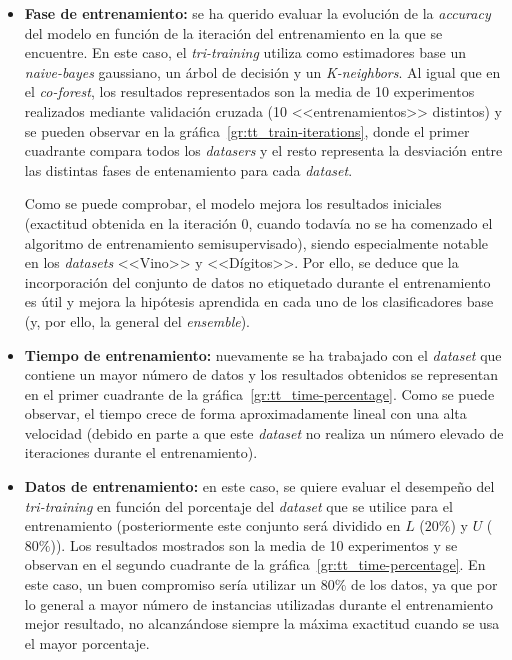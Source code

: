 \begin{itemize}
	\item \textbf{Fase de entrenamiento:} se ha querido evaluar la evolución de la \textit{accuracy} del modelo en función de la iteración del entrenamiento en la que se encuentre. En este caso, el \textit{tri-training} utiliza como estimadores base un \textit{naive-bayes} gaussiano, un árbol de decisión y un \textit{K-neighbors}. Al igual que en el \textit{co-forest}, los resultados representados son la media de 10 experimentos realizados mediante validación cruzada (10 <<entrenamientos>> distintos) y se pueden observar en la gráfica~\ref{gr:tt_train-iterations}, donde el primer cuadrante compara todos los \textit{datasers} y el resto representa la desviación entre las distintas fases de entenamiento para cada \textit{dataset}.
	
	Como se puede comprobar, el modelo mejora los resultados iniciales (exactitud obtenida en la iteración $0$, cuando todavía no se ha comenzado el algoritmo de entrenamiento semisupervisado), siendo especialmente notable en los \textit{datasets} <<Vino>> y  <<Dígitos>>. Por ello, se deduce que la incorporación del conjunto de datos no etiquetado durante el entrenamiento es útil y mejora la hipótesis aprendida en cada uno de los clasificadores base (y, por ello, la general del \textit{ensemble}).
	
	\item \textbf{Tiempo de entrenamiento:} nuevamente se ha trabajado con el \textit{dataset} que contiene un mayor número de datos y los resultados obtenidos se representan en el primer cuadrante de la gráfica~\ref{gr:tt_time-percentage}. Como se puede observar, el tiempo crece de forma aproximadamente lineal con una alta velocidad (debido en parte a que este \textit{dataset} no realiza un número elevado de iteraciones durante el entrenamiento).
	
	\item \textbf{Datos de entrenamiento:} en este caso, se quiere evaluar el desempeño del \textit{tri-training} en función del porcentaje del \textit{dataset} que se utilice para el entrenamiento (posteriormente este conjunto será dividido en $L$ ($20\%$) y $U$ ($80\%$)). Los resultados mostrados son la media de 10 experimentos y se observan en el segundo cuadrante de la gráfica~\ref{gr:tt_time-percentage}. En este caso, un buen compromiso sería utilizar un $80\%$ de los datos, ya que por lo general a mayor número de instancias utilizadas durante el entrenamiento mejor resultado, no alcanzándose siempre la máxima exactitud cuando se usa el mayor porcentaje.
\end{itemize} 

